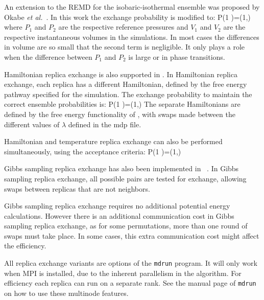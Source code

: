 An extension to the REMD for the isobaric-isothermal ensemble was
proposed by Okabe {\em et al.}~\cite{Okabe2001a}. In this work the
exchange probability is modified to:
\beq
P(1 )=\min\left(1,\exp{} \right)
\eeq
where $P_1$ and $P_2$ are the respective reference pressures and $V_1$ and
$V_2$ are the respective instantaneous volumes in the simulations.
In most cases the differences in volume are so small that the second
term is negligible. It only plays a role when the difference between
$P_1$ and $P_2$ is large or in phase transitions.

Hamiltonian replica exchange is also supported in {\gromacs}.  In
Hamiltonian replica exchange, each replica has a different
Hamiltonian, defined by the free energy pathway specified for the simulation.  The
exchange probability to maintain the correct ensemble probabilities is:
\beq P(1 )=\min\left(1,\exp{}
\right)
\eeq
The separate Hamiltonians are defined by the free energy functionality
of {\gromacs}, with swaps made between the different values of
$\lambda$ defined in the mdp file.

Hamiltonian and temperature replica exchange can also be performed
simultaneously, using the acceptance criteria:
\beq
P(1 )=\min\left(1,\exp{} \right)
\eeq

Gibbs sampling replica exchange has also been implemented in
{\gromacs}~\cite{Chodera2011}.  In Gibbs sampling replica exchange, all
possible pairs are tested for exchange, allowing swaps between
replicas that are not neighbors.

Gibbs sampling replica exchange requires no additional potential
energy calculations.  However there is an additional communication
cost in Gibbs sampling replica exchange, as for some permutations,
more than one round of swaps must take place.  In some cases, this
extra communication cost might affect the efficiency.

All replica exchange variants are options of the {\tt mdrun}
program. It will only work when MPI is installed, due to the inherent
parallelism in the algorithm. For efficiency each replica can run on a
separate rank.  See the manual page of {\tt mdrun} on how to use these
multinode features.

